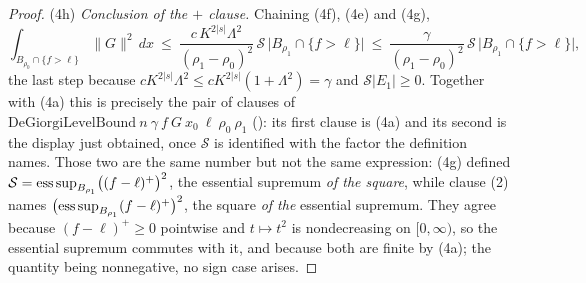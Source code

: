 \begin{proof}
\textup{(4h)} \emph{Conclusion of the $+$ clause.}  Chaining (4f), (4e) and
(4g),
\[
\int_{B_{\rho_0}\cap\{f>\ell\}}\|G\|^2\,dx
\ \le\ \frac{c\,K^{2|s|}\Lambda^2}{(\rho_1-\rho_0)^2}\,\mathcal S\,
\bigl|B_{\rho_1}\cap\{f>\ell\}\bigr|
\ \le\ \frac{\gamma}{(\rho_1-\rho_0)^2}\,\mathcal S\,
\bigl|B_{\rho_1}\cap\{f>\ell\}\bigr| ,
\]
the last step because $c K^{2|s|}\Lambda^2\le cK^{2|s|}(1+\Lambda^2)=\gamma$ and
$\mathcal S|E_1|\ge0$.  Together with (4a) this is precisely the pair of clauses
of $\mathrm{DeGiorgiLevelBound}\ n\ \gamma\ f\ G\ x_0\ \ell\ \rho_0\ \rho_1$
(): its first clause is (4a) and its second is the
display just obtained, once $\mathcal S$ is identified with the factor the
definition names.  Those two are the same number but not the same expression:
(4g) defined $\mathcal S=\operatorname*{ess\,sup}_{B_{\rho_1}}\bigl((f-\ell)^+\bigr)^2$, the
essential supremum \emph{of the square}, while clause (2) names
$\bigl(\operatorname*{ess\,sup}_{B_{\rho_1}}(f-\ell)^+\bigr)^2$, the square \emph{of the}
essential supremum.  They agree because $(f-\ell)^+\ge0$ pointwise and
$t\mapsto t^2$ is nondecreasing on $[0,\infty)$, so the essential supremum
commutes with it, and because both are finite by (4a); the quantity being
nonnegative, no sign case arises.


\end{proof}
